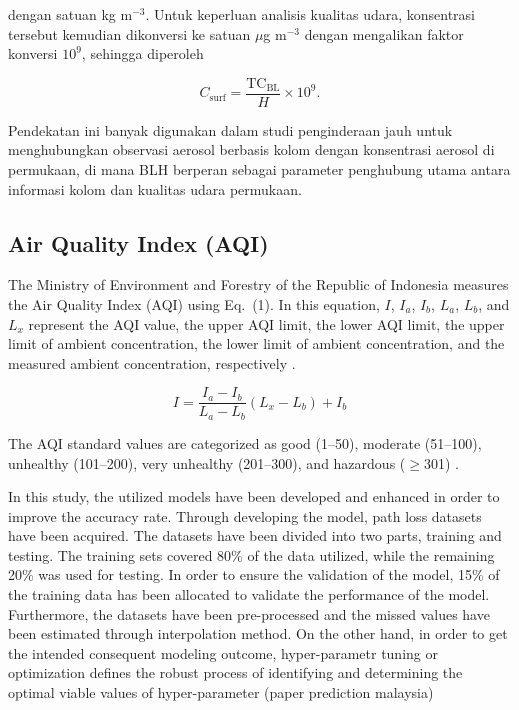 \documentclass[pdflatex,sn-mathphys-num]{sn-jnl}%
\theoremstyle{thmstyleone}%
\theoremstyle{thmstyletwo}%
\theoremstyle{thmstylethree}%
\begin{document}
dengan satuan kg m$^{-3}$. Untuk keperluan analisis kualitas udara, konsentrasi tersebut kemudian dikonversi ke satuan $\mu$g m$^{-3}$ dengan mengalikan faktor konversi $10^{9}$, sehingga diperoleh

\begin{equation}
C_{\mathrm{surf}} = \frac{\mathrm{TC}_{\mathrm{BL}}}{H} \times 10^{9}.
\end{equation}

Pendekatan ini banyak digunakan dalam studi penginderaan jauh untuk menghubungkan observasi aerosol berbasis kolom dengan konsentrasi aerosol di permukaan, di mana BLH berperan sebagai parameter penghubung utama antara informasi kolom dan kualitas udara permukaan.

\subsection{Air Quality Index (AQI)}

The Ministry of Environment and Forestry of the Republic of Indonesia measures the Air Quality Index (AQI) using Eq.~(1). In this equation, $I$, $I_a$, $I_b$, $L_a$, $L_b$, and $L_x$ represent the AQI value, the upper AQI limit, the lower AQI limit, the upper limit of ambient concentration, the lower limit of ambient concentration, and the measured ambient concentration, respectively \cite{keputusanmenlhk2020}.

\begin{equation}
I = \frac{I_a - I_b}{L_a - L_b} \left( L_x - L_b \right) + I_b
\tag{1}
\end{equation}

The AQI standard values are categorized as good (1--50), moderate (51--100), unhealthy (101--200), very unhealthy (201--300), and hazardous ($\geq$301) \cite{keputusanmenlhk2020}.

In this study, the utilized models have been developed and enhanced in order to improve the accuracy rate. Through developing the model, path loss datasets have been acquired. The datasets have been divided into two parts, training and testing. The training sets covered 80\% of the data utilized, while the remaining 20\% was used for testing. In order to ensure the validation of the model, 15\% of the training data has been allocated to validate the performance of the model. Furthermore, the datasets have been pre-processed and the missed values have been estimated through interpolation method. On the other hand, in order to get the intended consequent modeling outcome, hyper-parametr tuning or optimization defines the robust process of identifying and determining the optimal viable values of hyper-parameter (paper prediction malaysia)
\end{document}
